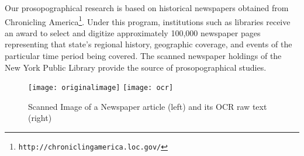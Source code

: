 Our prosopographical research is based on historical newspapers obtained from Chronicling America\footnote{\texttt{http://chroniclingamerica.loc.gov/}}. 
Under this program, institutions such as libraries receive an award to select and digitize approximately 100,000 newspaper pages representing that state's regional history, geographic coverage, and events of the particular time period being covered. The scanned newspaper holdings of the New York Public Library provide the source of prosopographical studies. 

\begin{figure*}
\texttt{[image: originalimage]}
\texttt{[image: ocr]}
\caption{Scanned Image of a Newspaper article (left) and its OCR raw text (right)}
\vspace{-10pt}
\label{figure:1}

\end{figure*}

